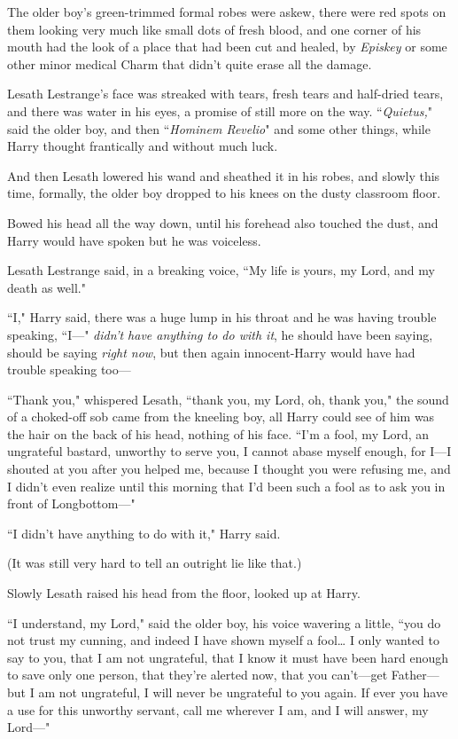 The older boy's green-trimmed formal robes were askew, there were red spots on them looking very much like small dots of fresh blood, and one corner of his mouth had the look of a place that had been cut and healed, by \emph{Episkey} or some other minor medical Charm that didn't quite erase all the damage.

Lesath Lestrange's face was streaked with tears, fresh tears and half-dried tears, and there was water in his eyes, a promise of still more on the way. ``\emph{Quietus,}" said the older boy, and then ``\emph{Hominem Revelio}" and some other things, while Harry thought frantically and without much luck.

And then Lesath lowered his wand and sheathed it in his robes, and slowly this time, formally, the older boy dropped to his knees on the dusty classroom floor.

Bowed his head all the way down, until his forehead also touched the dust, and Harry would have spoken but he was voiceless.

Lesath Lestrange said, in a breaking voice, ``My life is yours, my Lord, and my death as well."

``I," Harry said, there was a huge lump in his throat and he was having trouble speaking, ``I—" \emph{didn't have anything to do with it}, he should have been saying, should be saying \emph{right now}, but then again innocent-Harry would have had trouble speaking too—

``Thank you," whispered Lesath, ``thank you, my Lord, oh, thank you," the sound of a choked-off sob came from the kneeling boy, all Harry could see of him was the hair on the back of his head, nothing of his face. ``I'm a fool, my Lord, an ungrateful bastard, unworthy to serve you, I cannot abase myself enough, for I—I shouted at you after you helped me, because I thought you were refusing me, and I didn't even realize until this morning that I'd been such a fool as to ask you in front of Longbottom—"

``I didn't have anything to do with it," Harry said.

(It was still very hard to tell an outright lie like that.)

Slowly Lesath raised his head from the floor, looked up at Harry.

``I understand, my Lord," said the older boy, his voice wavering a little, ``you do not trust my cunning, and indeed I have shown myself a fool{\ldots} I only wanted to say to you, that I am not ungrateful, that I know it must have been hard enough to save only one person, that they're alerted now, that you can't—get Father—but I am not ungrateful, I will never be ungrateful to you again. If ever you have a use for this unworthy servant, call me wherever I am, and I will answer, my Lord—"

